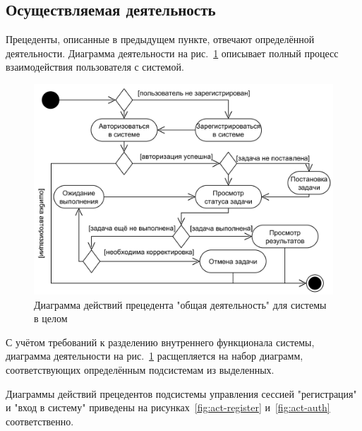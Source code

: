 \documentclass[a4paper,12pt]{report}
\numberwithin{equation}{section}
\begin{document}
\subsection{Осуществляемая деятельность}
Прецеденты, описанные в предыдущем пункте, отвечают определённой деятельности.
Диаграмма деятельности на рис.~\ref{fig:act-common} описывает полный процесс взаимодействия пользователя с системой.

\begin{figure} %
  \centering
  \includegraphics[width=.9\linewidth]{diagrams/common/activity}
  \caption{Диаграмма действий прецедента "общая деятельность" для системы в целом}
  \label{fig:act-common}
\end{figure}

С учётом требований к разделению внутреннего функционала системы, диаграмма деятельности на рис.~\ref{fig:act-common}
расщепляется на набор диаграмм, соответствующих определённым подсистемам из выделенных.

Диаграммы действий прецедентов подсистемы управления сессией "регистрация" и "вход в систему" приведены на рисунках~\ref{fig:act-register} и~\ref{fig:act-auth} соответственно.
\end{document}
